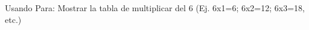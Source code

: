 ﻿
Usando Para: Mostrar la tabla de multiplicar del 6 (Ej. 6x1=6; 6x2=12; 6x3=18, etc.)



\volverindice
\newpage

